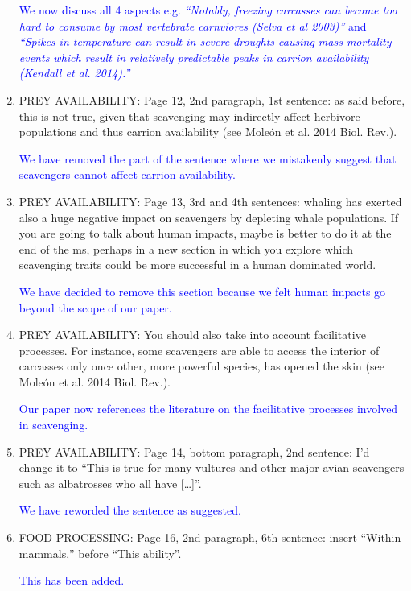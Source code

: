 \documentclass[12pt,letterpaper]{article}
\begin{document}
\begin{enumerate}
\textcolor{blue}{We now discuss all 4 aspects e.g. \textit{``Notably, freezing carcasses can become too hard to consume by most vertebrate carnviores (Selva et al 2003)''} and \textit{``Spikes in temperature can result in severe droughts causing mass mortality events which result in relatively predictable peaks in carrion availability (Kendall et al. 2014).''}}


\item{PREY AVAILABILITY:} Page 12, 2nd paragraph, 1st sentence: as said before, this is not true, given that scavenging may indirectly affect herbivore populations and thus carrion availability (see Mole\'{o}n et al. 2014 Biol. Rev.).

\textcolor{blue}{We have removed the part of the sentence where we mistakenly suggest that scavengers cannot affect carrion availability.}

\item{PREY AVAILABILITY:} Page 13, 3rd and 4th sentences: whaling has exerted also a huge negative impact on scavengers by depleting whale populations. If you are going to talk about human impacts, maybe is better to do it at the end of the ms, perhaps in a new section in which you explore which scavenging traits could be more successful in a human dominated world.

\textcolor{blue}{We have decided to remove this section because we felt human impacts go beyond the scope of our paper.}

\item{PREY AVAILABILITY:} You should also take into account facilitative processes. For instance, some scavengers are able to access the interior of carcasses only once other, more powerful species, has opened the skin (see Mole\'{o}n et al. 2014 Biol. Rev.).

\textcolor{blue}{Our paper now references the literature on the facilitative processes involved in scavenging.}

\item{PREY AVAILABILITY:} Page 14, bottom paragraph, 2nd sentence: I'd change it to ``This is true for many vultures and other major avian scavengers such as albatrosses who all have […]''.

\textcolor{blue}{We have reworded the sentence as suggested.}

\item{FOOD PROCESSING:} Page 16, 2nd paragraph, 6th sentence: insert ``Within mammals,'' before ``This ability''.

\textcolor{blue}{This has been added.}


\end{enumerate}
\end{document}
